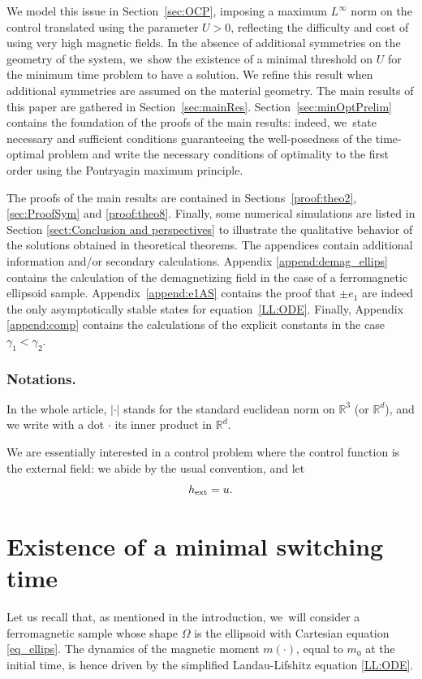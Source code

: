 \documentclass[10pt]{amsart}
\theoremstyle{definition}
\newcommand{\R} {\mathbb{R}}
\begin{document}
We model this issue in Section~\ref{sec:OCP}, imposing a maximum $L^\infty$ norm on the control translated using the parameter $U>0$, reflecting the difficulty and cost of using very high magnetic fields. In the absence of additional symmetries on the geometry of the system, we~show the existence of a minimal threshold on $U$ for the minimum time problem to have a solution. We refine this result when additional symmetries are assumed on the material geometry. The main results of this paper are gathered in Section~\ref{sec:mainRes}. Section~\ref{sec:minOptPrelim} contains the foundation of the proofs of the main results: indeed, we~state necessary and sufficient conditions guaranteeing the well-posedness of the time-optimal problem and write the necessary conditions of optimality to the first order using the Pontryagin maximum principle.

The proofs of the main results are contained in Sections~\ref{proof:theo2}, \ref{sec:ProofSym} and \ref{proof:theo8}. Finally, some numerical simulations are listed in Section \ref{sect:Conclusion and perspectives} to illustrate the qualitative behavior of the solutions obtained in theoretical theorems. The appendices contain additional information and/or secondary calculations. Appendix \ref{append:demag_ellips} contains the calculation of the demagnetizing field in the case of a ferromagnetic ellipsoid sample. Appendix~\ref{append:e1AS} contains the proof that $\pm e_1$ are indeed the only asymptotically stable states for equation~\eqref{LL:ODE}. Finally, Appendix \ref{append:comp} contains the calculations of the explicit constants in the case $\gamma_1<\gamma_2$.

\subsubsection*{Notations.}
In the whole article, $|\cdot|$ stands for the standard euclidean norm on $\R^3$ (or $\R^d$), and we write with a dot $\cdot$ its inner product in $\R^d$.

We are essentially interested in a control problem where the control function is the external field: we abide by the usual convention, and let
\[ h_{\rm ext}=u. \]

\section{Existence of a minimal switching time}
Let us recall that, as mentioned in the introduction, we~will consider a ferromagnetic sample whose shape $\Omega$ is the ellipsoid with Cartesian equation \eqref{eq_ellips}. The dynamics of the magnetic moment $m(\cdot)$, equal to $m_0$ at the initial time, is hence driven by the simplified Landau-Lifshitz equation \eqref{LL:ODE}.
\end{document}
